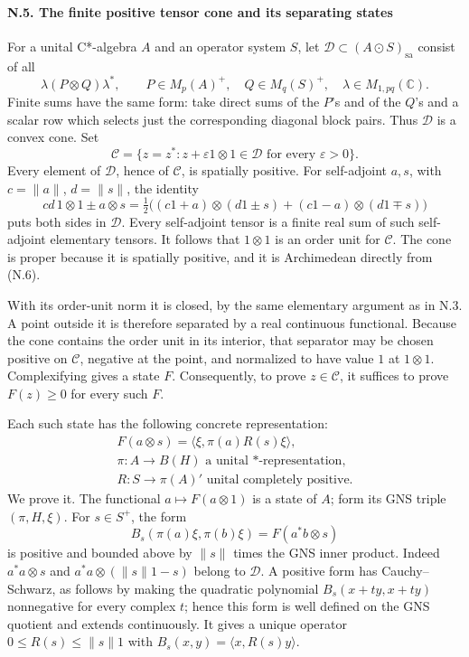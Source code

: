 \documentclass[
  11pt,
]{article}
\begin{document}
\paragraph{N.5. The finite positive tensor cone and its separating
states}\label{n.5.-the-finite-positive-tensor-cone-and-its-separating-states}

For a unital C*-algebra \(A\) and an operator system \(S\), let
\(\mathcal D\subset(A\odot S)_{\mathrm{sa}}\) consist of all \[
\lambda(P\otimes Q)\lambda^*,
\qquad
P\in M_p(A)^+,\quad Q\in M_q(S)^+,\quad
\lambda\in M_{1,pq}(\mathbb C).
\tag{N.5}
\] Finite sums have the same form: take direct sums of the \(P\)'s and
of the \(Q\)'s and a scalar row which selects just the corresponding
diagonal block pairs. Thus \(\mathcal D\) is a convex cone. Set \[
\mathcal C=\{z=z^*:z+\varepsilon1\otimes1\in\mathcal D
                 \text{ for every }\varepsilon>0\}.
\tag{N.6}
\] Every element of \(\mathcal D\), hence of \(\mathcal C\), is
spatially positive. For self-adjoint \(a,s\), with \(c=\|a\|\),
\(d=\|s\|\), the identity \[
cd\,1\otimes1\pm a\otimes s
=\tfrac12\big((c1+a)\otimes(d1\pm s)
             +(c1-a)\otimes(d1\mp s)\big)
\tag{N.7}
\] puts both sides in \(\mathcal D\). Every self-adjoint tensor is a
finite real sum of such self-adjoint elementary tensors. It follows that
\(1\otimes1\) is an order unit for \(\mathcal C\). The cone is proper
because it is spatially positive, and it is Archimedean directly from
(N.6).

With its order-unit norm it is closed, by the same elementary argument
as in N.3. A point outside it is therefore separated by a real
continuous functional. Because the cone contains the order unit in its
interior, that separator may be chosen positive on \(\mathcal C\),
negative at the point, and normalized to have value \(1\) at
\(1\otimes1\). Complexifying gives a state \(F\). Consequently, to prove
\(z\in\mathcal C\), it suffices to prove \(F(z)\geq0\) for every such
\(F\).

Each such state has the following concrete representation: \[
\begin{gathered}
F(a\otimes s)=\langle\xi,\pi(a)R(s)\xi\rangle,\\
\pi:A\to B(H)\text{ a unital *-representation},\\
R:S\to\pi(A)'\text{ unital completely positive}.
\end{gathered}
\tag{N.8}
\] We prove it. The functional \(a\mapsto F(a\otimes1)\) is a state of
\(A\); form its GNS triple \((\pi,H,\xi)\). For \(s\in S^+\), the form
\[
B_s(\pi(a)\xi,\pi(b)\xi)=F(a^*b\otimes s)
\] is positive and bounded above by \(\|s\|\) times the GNS inner
product. Indeed \(a^*a\otimes s\) and \(a^*a\otimes(\|s\|1-s)\) belong
to \(\mathcal D\). A positive form has Cauchy--Schwarz, as follows by
making the quadratic polynomial \(B_s(x+ty,x+ty)\) nonnegative for every
complex \(t\); hence this form is well defined on the GNS quotient and
extends continuously. It gives a unique operator
\(0\leq R(s)\leq\|s\|1\) with \(B_s(x,y)=\langle x,R(s)y\rangle\).
\end{document}
